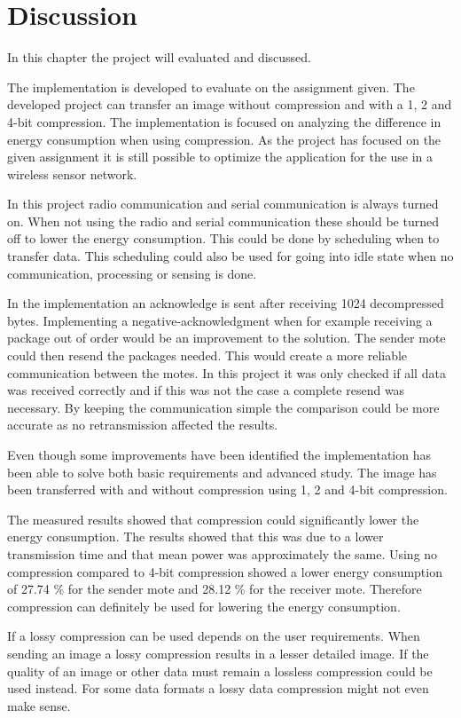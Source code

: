 \chapter{Discussion}
\label{chp:disc}

In this chapter the project will evaluated and discussed.

The implementation is developed to evaluate on the assignment given. The developed project can transfer an image without compression and with a 1, 2 and 4-bit compression. The implementation is focused on analyzing the difference in energy consumption when using compression.  As the project has focused on the given assignment it is still possible to optimize the application for the use in a wireless sensor network.  

In this project radio communication and serial communication is always turned on. When not using the radio and serial communication these should be turned off to lower the energy consumption. This could be done by scheduling when to transfer data. This scheduling could also be used for going into idle state when no communication, processing or sensing is done.

In the implementation an acknowledge is sent after receiving 1024 decompressed bytes. Implementing a negative-acknowledgment when for example receiving a package out of order would be an improvement to the solution. The sender mote could then resend the packages needed. This would create a more reliable communication between the motes. In this project it was only checked if all data was received correctly and if this was not the case a complete resend was necessary. By keeping the communication simple the comparison could be more accurate as no retransmission affected the results.

Even though some improvements have been identified the implementation has been able to solve both basic requirements and advanced study. The image has been transferred with and without compression using 1, 2 and 4-bit compression. 

The measured results showed that compression could significantly lower the energy consumption. The results showed that this was due to a lower transmission time and that  mean power was approximately the same. Using no compression compared to 4-bit compression showed a lower energy consumption of 27.74 \% for the sender mote and 28.12 \% for the receiver mote. Therefore compression can definitely be used for lowering the energy consumption.

If a lossy compression can be used depends on the user requirements. When sending an image a lossy compression results in a lesser detailed image. If the quality of an image or other data must remain a lossless compression could be used instead. For some data formats a lossy data compression might not even make sense.

